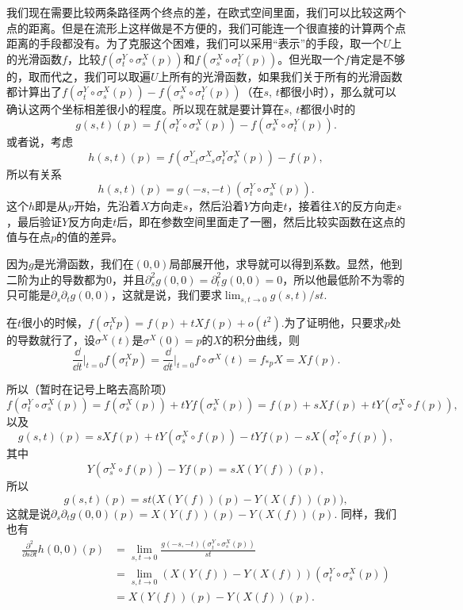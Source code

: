 我们现在需要比较两条路径两个终点的差，在欧式空间里面，我们可以比较这两个点的距离。但是在流形上这样做是不方便的，我们可能连一个很直接的计算两个点距离的手段都没有。为了克服这个困难，我们可以采用“表示”的手段，取一个$U$上的光滑函数$f$，比较$f(\sigma^Y_t\circ\sigma^X_s(p))$和$f(\sigma^X_s\circ\sigma^Y_t(p))$。但光取一个$f$肯定是不够的，取而代之，我们可以取遍$U$上所有的光滑函数，如果我们关于所有的光滑函数都计算出了$f(\sigma^Y_t\circ\sigma^X_s(p))-f(\sigma^X_s\circ\sigma^Y_t(p))$（在$s$, $t$都很小时），那么就可以确认这两个坐标相差很小的程度。所以现在就是要计算在$s$, $t$都很小时的
\[
	g(s,t)(p)=f(\sigma^Y_t\circ\sigma^X_s(p))-f(\sigma^X_s\circ\sigma^Y_t(p)).
\]
或者说，考虑
\[
	h(s,t)(p)=f(\sigma^Y_{-t}\sigma^X_{-s}\sigma^Y_{t}\sigma^X_{s}(p))-f(p),
\]
所以有关系
\[
	h(s,t)(p)=g(-s,-t)\left(\sigma^Y_t\circ\sigma^X_s(p)\right).
\]
这个$h$即是从$p$开始，先沿着$X$方向走$s$，然后沿着$Y$方向走$t$，接着往$X$的反方向走$s$，最后验证$Y$反方向走$t$后，即在参数空间里面走了一圈，然后比较实函数在这点的值与在点$p$的值的差异。

因为$g$是光滑函数，我们在$(0,0)$局部展开他，求导就可以得到系数。显然，他到二阶为止的导数都为$0$，并且$\partial_s^2g(0,0)=\partial_t^2g(0,0)=0$，所以他最低阶不为零的只可能是$\partial_s\partial_t g(0,0)$，这就是说，我们要求$\lim_{s,t\to 0}g(s,t)/st$.

\para 在$t$很小的时候，$f(\sigma_t^X p)=f(p)+tXf(p)+o(t^2)$.为了证明他，只要求$p$处的导数就行了，设$\sigma^X(t)$是$\sigma^X(0)=p$的$X$的积分曲线，则
\[
	\frac{\dd}{\dd t}\biggr|_{t=0}f(\sigma_t^X p)=\frac{\dd}{\dd t}\biggr|_{t=0}f\circ \sigma^X (t)=f_{* p}X=Xf(p).
\]

所以（暂时在记号上略去高阶项）
\[
	f(\sigma^Y_t\circ\sigma^X_s(p))=f(\sigma^X_s(p))+tYf(\sigma^X_s(p))=f(p)+sXf(p)+tY(\sigma^X_s\circ f(p)),
\]
以及
\[
	g(s,t)(p)=sXf(p)+tY(\sigma^X_s\circ f(p))-tYf(p)-sX(\sigma^Y_t\circ f(p)),
\]
其中
\[
	Y(\sigma^X_s\circ f(p))-Yf(p)=sX(Y(f))(p),
\]
所以
\[
	g(s,t)(p)=st\bigl(X(Y(f))(p)-Y(X(f))(p)\bigr),
\]
这就是说$\partial_s\partial_t g(0,0)(p)=X(Y(f))(p)-Y(X(f))(p)$. 同样，我们也有
\[
\begin{aligned}
	\frac{\partial^2}{\partial s\partial t} h(0,0)(p)&=\lim_{s,t\to 0}\frac{g(-s,-t)\left(\sigma^Y_t\circ\sigma^X_s(p)\right)}{st}\\
	&=\lim_{s,t\to 0}\left(X(Y(f))-Y(X(f))\right)\left(\sigma^Y_t\circ\sigma^X_s(p)\right)\\
	&=X(Y(f))(p)-Y(X(f))(p).
\end{aligned}
\]

